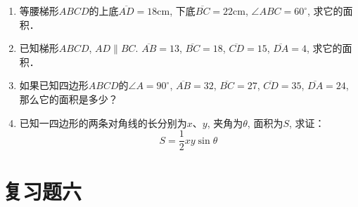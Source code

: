 \begin{enumerate}
\item  等腰梯形$ABCD$的上底$\overline{AD}=18$cm, 下底$\overline{BC}=22$cm, 
$\angle ABC=60^{\circ}$, 求它的面积．
\item 已知梯形$ABCD$, $AD\parallel BC$. $\overline{AB}=13$, $\overline{BC}=18$, 
$\overline{CD}=15$, $\overline{DA}=4$, 求它的面积．
\item 如果已知四边形$ABCD$的$\angle A=90^{\circ}$, $\overline{AB}=32$, $\overline{BC}=
27$, $\overline{CD}=35$, $\overline{DA}=24$, 那么它的面积是多少？
\item 已知一四边形的两条对角线的长分别为$x$、$y$, 夹角为$\theta$, 
面积为$S$, 求证：
\[S=\frac{1}{2}xy\sin\theta\]
\end{enumerate}

\section*{复习题六}
